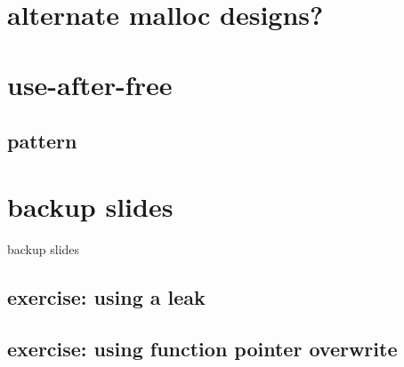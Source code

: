 \section{alternate malloc designs?}


\section{use-after-free}


\subsection{pattern}

\section{backup slides}
\begin{frame}{backup slides}
\end{frame}
\subsection{exercise: using a leak}


\subsection{exercise: using function pointer overwrite}



